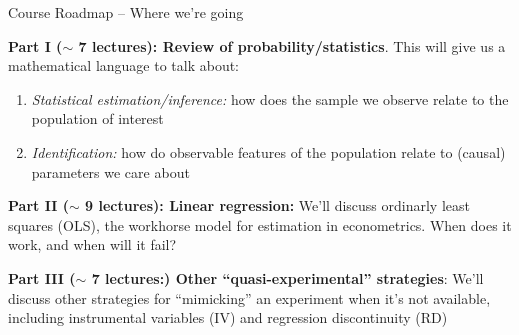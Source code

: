 \documentclass[11pt,english,handout]{beamer}
\newenvironment{wideitemize}{\itemize\addtolength{\itemsep}{10pt}}{\enditemize}
\begin{document}
\begin{frame}{Course Roadmap -- Where we're going}
	\begin{wideitemize}
		\item
		\textbf{Part I ($\sim$ 7 lectures): Review of probability/statistics}. This will give us a mathematical language to talk about:
		
			\begin{enumerate}
				\item 
				\textit{Statistical estimation/inference: }how does the sample we observe relate to the population of interest
				
				\item
				\textit{Identification:} how do observable features of the population relate to (causal) parameters we care about
			\end{enumerate}
		\pause 
		
		\item
		\textbf{Part II ($\sim$ 9 lectures): Linear regression: } We'll discuss ordinarly least squares (OLS), the workhorse model for estimation in econometrics. When does it work, and when will it fail?
		
		\pause
		\item
		\textbf{Part III ($\sim$ 7 lectures:) Other ``quasi-experimental'' strategies}: We'll discuss other strategies for ``mimicking'' an experiment when it's not available, including instrumental variables (IV) and regression discontinuity (RD)
			 
	\end{wideitemize}
\end{frame}
\end{document}
